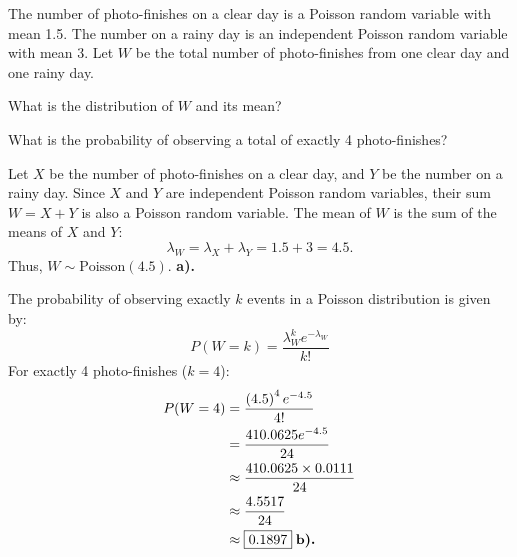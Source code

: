 \documentclass[a4paper, 10pt]{article}
\begin{document}
\pagebreak

\begin{problem}
The number of photo-finishes on a clear day is a Poisson random variable with mean 1.5.
The number on a rainy day is an independent Poisson random variable with mean 3.
Let \( W \) be the total number of photo-finishes from one clear day and one rainy day.
\begin{subproblems}
    \item What is the distribution of \( W \) and its mean?
    \item What is the probability of observing a total of exactly 4 photo-finishes?
\end{subproblems}
\end{problem}

\begin{solution}
Let \( X \) be the number of photo-finishes on a clear day, and \( Y \) be the number on a rainy day.
Since \( X \) and \( Y \) are independent Poisson random variables, their sum \( W = X + Y \) is also a Poisson random variable.
The mean of \( W \) is the sum of the means of \( X \) and \( Y \):
\[
    \lambda_W = \lambda_X + \lambda_Y = 1.5 + 3 = 4.5.
\]
Thus, \( \boxed{W \sim \text{Poisson}(4.5)} \). \textbf{a).}

\vspace{2mm}

\par\noindent The probability of observing exactly \( k \) events in a Poisson distribution is given by:
\[
    P(W = k) = \frac{\lambda_W^k e^{-\lambda_W}}{k!}
\]
For exactly 4 photo-finishes (\( k = 4 \)):
\begin{align*}
    P(W = 4) &= \frac{\left(4.5\right)^4 e^{-4.5}}{4!} \\
    &= \frac{410.0625 e^{-4.5}}{24} \\
    &\approx \frac{410.0625 \times 0.0111}{24} \\
    &\approx \frac{4.5517}{24} \\
    &\approx \boxed{0.1897} \; \textbf{b).}
\end{align*}
\end{solution}
\end{document}
